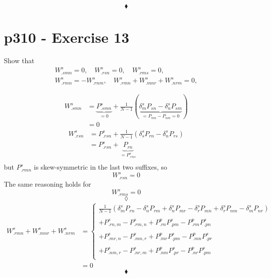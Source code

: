 $$\blacklozenge$$
\newpage



\section{p310 - Exercise 13}
\begin{tcolorbox}
Show that 
$$\begin{matrix}
W^s_{.smn} =0,\quad W^s_{.rsn} =0,\quad W^s_{.rms} =0,\\
W^s_{.rmn} =-W^s_{.rnm} ,\quad W^s_{.rmn}+W^s_{.mnr}+W^s_{.nrm}=0,
\end{matrix}$$
\end{tcolorbox}
\begin{align*}
W^s_{.smn}&=\underbrace{P^s_{.smn}}_{=0}+\frac{1}{N-1}\left(\underbrace{\delta^s_m P_{sn}-\delta^s_nP_{sm}}_{=P_{mn}-P_{nm} =0}\right)\\
&=0
\end{align*}
\begin{align*}
W^s_{.rsn}&=P^s_{.rsn}+\frac{1}{N-1}\left(\delta^s_s P_{rn}-\delta^s_nP_{rs}\right)\\
&=P^s_{.rsn}+\underbrace{P_{rn}}_{= P^s_{.rns}}\\
\end{align*}
but $P^s_{.rmn}$ is skew-symmetric in the last two suffixes, so
$$W^s_{.rsn}=0$$
The same reasoning holds for $$W^s_{.rms}=0$$
$$\lozenge$$
\begin{align*}
W^s_{.rmn}+W^s_{.mnr}+W^s_{.nrm}&=\left\{\begin{matrix}
\frac{1}{N-1} \left(\delta^s_mP_{rn}-\delta^s_nP_{rm}+\delta^s_nP_{mr}-\delta^s_rP_{mn}+\delta^s_rP_{nm}-\delta^s_mP_{nr} \right)\\\\
+P^s_{.rn,m}-P^s_{.rm,n}+P^p_{.rn}P^s_{.pm}-P^p_{.rm}P^s_{.pn}\\\\
+P^s_{.mr,n}-P^s_{.mn,r}+P^p_{.mr}P^s_{.pm}-P^p_{.mn}P^s_{.pr}\\\\
+P^s_{.nm,r}-P^s_{.nr,m}+P^p_{.nm}P^s_{.pr}-P^p_{.nr}P^s_{.pm}\\
\end{matrix}\right.\\
&=0
\end{align*}
$$\blacklozenge$$
\newpage



